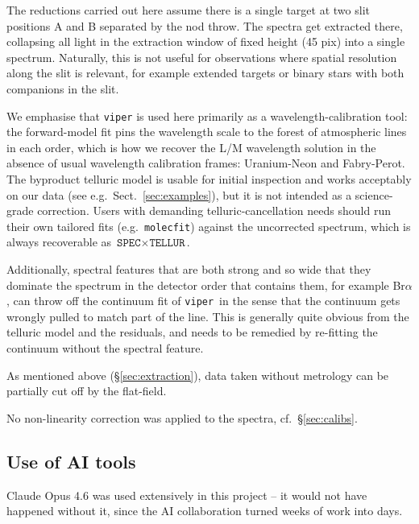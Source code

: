 \documentclass{aa}
\newcommand{\viper}{\texttt{viper}}
\begin{document}
The reductions carried out here assume there is a single target at two 
slit positions A and B separated by the nod throw. 
The spectra get extracted there, collapsing
all light in the extraction window of fixed height (45 pix) into a single spectrum.
Naturally, this
is not useful for observations where spatial resolution along the slit is relevant,
for example extended targets or binary stars with both companions in
the slit.

We emphasise that \viper{} is used here primarily as a wavelength-calibration
tool: the forward-model fit pins the wavelength scale to the forest of
atmospheric lines in each order, which is how we recover the L/M wavelength
solution in the absence of usual wavelength calibration frames: Uranium-Neon and Fabry-Perot. 
The byproduct telluric model is usable for initial inspection and works acceptably on our data 
(see e.g.\ Sect.~\ref{sec:examples}), but it is not
intended as a science-grade correction. Users with demanding
telluric-cancellation needs should run their own tailored fits
(e.g.\ \texttt{molecfit}) against the uncorrected spectrum, which is always
recoverable as $\texttt{SPEC} \times \texttt{TELLUR}$.

Additionally, spectral features that are both strong and so wide that they dominate
the spectrum in the detector order that contains them, for example Br$\alpha$, can throw off
the continuum fit of \viper\, in the sense that the continuum gets wrongly
pulled to match part of the line. This is generally quite obvious from the telluric model and the
residuals, and needs to be remedied by re-fitting the continuum without
the spectral feature.

As mentioned above (\S \ref{sec:extraction}),
 data taken without metrology can be partially cut off by the flat-field.
 
No non-linearity correction was applied to the spectra, cf.~\S \ref{sec:calibs}.

\subsection{Use of AI tools}
\label{sec:ai}

Claude Opus 4.6 \citep{claude_opus46} was used extensively in this project --
it would not have happened without it, since the AI collaboration turned weeks
of work into days.
\end{document}
